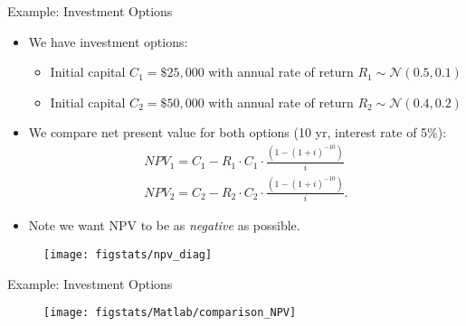 \documentclass[9pt]{beamer}
\begin{document}
%
\begin{frame}{Example: Investment Options}
\begin{itemize}
\item We have investment options:
\begin{itemize}
\item Initial capital $C_1=\$25,000$ with annual rate of return $R_1\sim \mathcal{N}(0.5,0.1)$
\item Initial capital $C_2=\$50,000$ with annual rate of return $R_2\sim \mathcal{N}(0.4,0.2)$
\end{itemize}
\item We compare net present value for both options (10 yr, interest rate of 5\%):
\begin{align*}
NPV_1=C_1 - R_1\cdot C_1\cdot \frac{(1-(1+i)^{-10})}{i}\\
NPV_2=C_2 - R_2\cdot C_2\cdot \frac{(1-(1+i)^{-10})}{i}.
\end{align*}
\item Note we want NPV to be as {\em negative} as possible. 
\end{itemize}

\begin{figure}[!htb]
    \centering
	\texttt{[image: figstats/npv\_diag]}
\end{figure}

\end{frame}

%
\begin{frame}{Example: Investment Options}

\begin{figure}[!htb]
    \centering
	\texttt{[image: figstats/Matlab/comparison\_NPV]}
\end{figure}

\end{frame}
\end{document}
